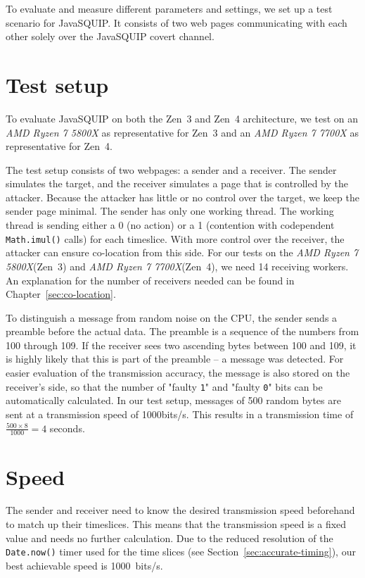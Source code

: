 \documentclass[11pt,
  titlepage=false,
  parskip=half,      %
]{scrreprt}
\begin{document}
To evaluate and measure different parameters and settings, we set up a test scenario for JavaSQUIP.
It consists of two web pages communicating with each other solely over the JavaSQUIP covert channel.

\section {Test setup}
\label{sec:testsetup}
To evaluate JavaSQUIP on both the Zen~3 and Zen~4 architecture,
we test on an \textit{AMD Ryzen 7 5800X} as representative for Zen~3 and an \textit{AMD Ryzen 7 7700X} as representative for Zen~4.

The test setup consists of two webpages: a sender and a receiver.
The sender simulates the target, and the receiver simulates a page that is controlled by the attacker.
Because the attacker has little or no control over the target, we keep the sender page minimal.
The sender has only one working thread.
The working thread is sending either a 0 (no action) or a 1 (contention with codependent \texttt{Math.imul()} calls) for each timeslice.
With more control over the receiver, the attacker can ensure co-location from this side.
For our tests on the \textit{AMD Ryzen 7 5800X}(Zen~3) and \textit{AMD Ryzen 7 7700X}(Zen~4), we need 14 receiving workers.
An explanation for the number of receivers needed can be found in Chapter~\ref{sec:co-location}.

To distinguish a message from random noise on the CPU, the sender sends a preamble before the actual data.
The preamble is a sequence of the numbers from 100 through 109.
If the receiver sees two ascending bytes between 100 and 109, it is highly likely that this is part of the preamble --
a message was detected.
For easier evaluation of the transmission accuracy, the message is also stored on the receiver's side,
so that the number of "faulty \texttt{1}" and "faulty \texttt{0}" bits can be automatically calculated.
In our test setup, messages of 500 random bytes are sent at a transmission speed of 1000bits/s.
This results in a transmission time of $\frac{500 \times 8}{1000} = 4$ seconds.

\section{Speed}
The sender and receiver need to know the desired transmission speed beforehand to match up their timeslices.
This means that the transmission speed is a fixed value and needs no further calculation.
Due to the reduced resolution of the \texttt{Date.now()} timer used for the time slices (see Section~\ref{sec:accurate-timing}),
our best achievable speed is 1000~bits/s.
\end{document}

